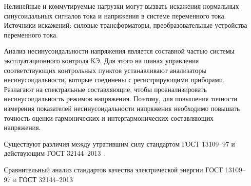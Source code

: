 


Нелинейные и коммутируемые нагрузки могут вызвать искажения нормальных синусоидальных сигналов тока и напряжения в системе переменного тока. Источники искажений: силовые трансформаторы, преобразовательные устройства переменного тока.

Анализ несинусоидальности напряжения является составной частью системы эксплуатационного контроля КЭ. Для этого на шинах управления соответствующих контрольных пунктов устанавливают анализаторы несинусоидальности, которые соединены с регистрирующими приборами. Разлагают на спектральные составляющие, чтобы проанализировать несинусоидальность режимов напряжения. Поэтому, для повышения точности измерения показателей несинусоидальности напряжения необходимо повышать точность оценки гармонических и интергармонических составляющих напряжения. 

Существуют различия между утратившим силу стандартом ГОСТ 13109--97 \cite{GOST13109-97} и действующим ГОСТ 32144--2013 \cite{GOST32144-2013}.

Сравнительный анализ стандартов качества электрической энергии ГОСТ 13109--97 и ГОСТ 32144--2013 \cite[с.~155]{Comparative_analysis_Kiselev_2016}


